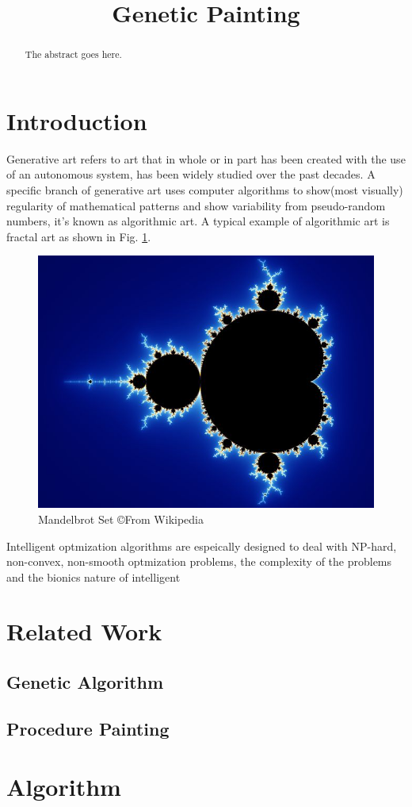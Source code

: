 \documentclass[a4paper,conference]{IEEEtran}
\begin{document}
\title{Genetic Painting}
\author{
  }
\maketitle

\begin{abstract}
  The abstract goes here.
\end{abstract}
\section{Introduction}
Generative art refers to art that in whole or in part has been created with the use of an autonomous system, has been widely studied over the past decades. A specific branch of generative art uses computer algorithms to show(most visually) regularity of mathematical patterns and show variability from pseudo-random numbers, it's known as algorithmic art. A typical example of algorithmic art is fractal art as shown in Fig. \ref{fig:fracal}.

\begin{figure}[htp]
  \centering
  \includegraphics[width=.8\columnwidth]{imgs/mandelbrot_set.jpg}
  \caption{Mandelbrot Set \copyright From Wikipedia}
  \label{fig:fracal}
\end{figure}

Intelligent optmization algorithms are espeically designed to deal with NP-hard, non-convex, non-smooth optmization problems, the complexity of the problems and the bionics nature of intelligent 

\section{Related Work}

\subsection{Genetic Algorithm}

\subsection{Procedure Painting}

\section{Algorithm}
\end{document}

